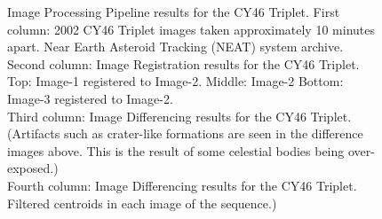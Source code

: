 \begin{figure}[h]
\begin{center}
\end{center}
\caption[caption]{Image Processing Pipeline results for the CY46 Triplet. First column: 2002 CY46 Triplet images taken approximately 10 minutes apart. Near Earth Asteroid Tracking (NEAT) system archive. \\\hspace{\textwidth} Second column: Image Registration results for the CY46 Triplet.  Top: Image-1 registered to Image-2. Middle: Image-2 Bottom: Image-3 registered to Image-2. \\\hspace{\textwidth} Third column: Image Differencing results for the CY46 Triplet. (Artifacts such as crater-like formations are seen in the difference images above. This is the result of some celestial bodies being over-exposed.) \\\hspace{\textwidth} Fourth column: Image Differencing results for the CY46 Triplet. Filtered centroids in each image of the sequence.)}
\label{IPP_NEAT_Layout2}
\end{figure}

